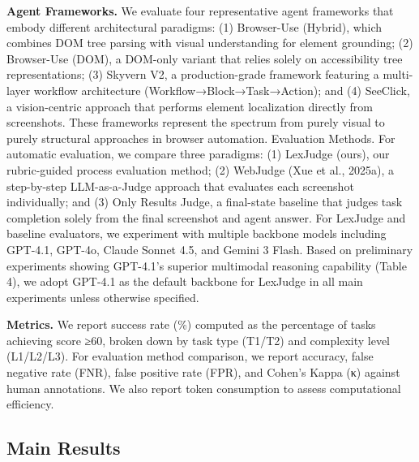 \noindent \textbf{Agent Frameworks.} We evaluate four representative agent frameworks that embody different architectural paradigms: (1) Browser-Use (Hybrid), which combines DOM tree parsing with visual understanding for element grounding; (2) Browser-Use (DOM), a DOM-only variant that relies solely on accessibility tree representations; (3) Skyvern V2, a production-grade framework featuring a multi-layer workflow architecture (Workflow→Block→Task→Action); and (4) SeeClick, a vision-centric approach that performs element localization directly from screenshots. These frameworks represent the spectrum from purely visual to purely structural approaches in browser automation.
Evaluation Methods. For automatic evaluation, we compare three paradigms: (1) LexJudge (ours), our rubric-guided process evaluation method; (2) WebJudge (Xue et al., 2025a), a step-by-step LLM-as-a-Judge approach that evaluates each screenshot individually; and (3) Only Results Judge, a final-state baseline that judges task completion solely from the final screenshot and agent answer. For LexJudge and baseline evaluators, we experiment with multiple backbone models including GPT-4.1, GPT-4o, Claude Sonnet 4.5, and Gemini 3 Flash. Based on preliminary experiments showing GPT-4.1's superior multimodal reasoning capability (Table 4), we adopt GPT-4.1 as the default backbone for LexJudge in all main experiments unless otherwise specified.

% 


\noindent \textbf{Metrics.} We report success rate (\%) computed as the percentage of tasks achieving score ≥60, broken down by task type (T1/T2) and complexity level (L1/L2/L3). For evaluation method comparison, we report accuracy, false negative rate (FNR), false positive rate (FPR), and Cohen's Kappa (κ) against human annotations. We also report token consumption to assess computational efficiency.


\subsection{Main Results}
\label{subsec:main_results}




